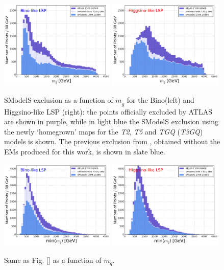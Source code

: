 \documentclass[a4paper,11pt]{article}
\newcommand{\MSQ}{$ m _{ \tilde q } $\xspace}
\newcommand{\MGLU}{$ m _{ \tilde g } $\xspace}
\begin{document}
\begin{figure}[!]
\begin{center}
\subfigure
\includegraphics[width=0.49\textwidth]{PLOTS/Bino_Comparison_Gluino.png}
\subfigure
{\includegraphics[width=0.49\textwidth]{PLOTS/Higgsino_Comparison_Gluino.png}}
\end{center}
\caption{SModelS exclusion as a function of \MGLU for the Bino(left) and Higgsino-like LSP (right): the points officially excluded by ATLAS are shown in purple, while in light blue the SModelS exclusion using the newly `homegrown' maps for the \textit{T2}, \textit{T5} and \textit{TGQ} (\textit{T3GQ}) models is shown. The previous exclusion from \cite{Ambrogi:2017lov}, obtained without the EMs produced for this work, is shown in slate blue.} 
\label{pmssm_new_exclusion_gluino}
\end{figure}
%
\begin{figure}[!]
\begin{center}
\subfigure
\includegraphics[width=0.49\textwidth]{PLOTS/Bino_Comparison_Squark.png}
\subfigure
{\includegraphics[width=0.49\textwidth]{PLOTS/Higgsino_Comparison_Squark.png}}
\end{center}
\caption{Same as Fig. \ref{} as a function of \MSQ.} 
\label{pmssm_new_exclusion_squark}
\end{figure}
\end{document}

